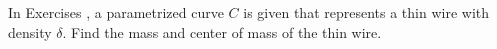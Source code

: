 {\noindent In Exercises}
{, a parametrized curve $C$ is given that represents a thin wire with density $\delta$. Find the mass and center of mass of the thin wire.}
